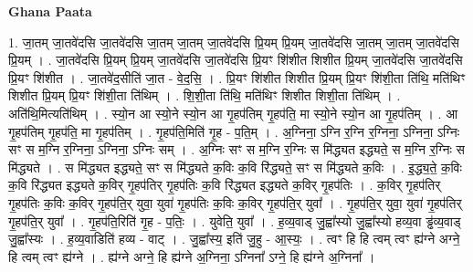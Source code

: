 \documentclass[17pt]{extarticle}
\begin{document}
\textbf{Ghana Paata } \newline

1. जा॒तम् जा॒तवे॑दसि जा॒तवे॑दसि जा॒तम् जा॒तम् जा॒तवे॑दसि प्रि॒यम् प्रि॒यम् जा॒तवे॑दसि जा॒तम् जा॒तम् जा॒तवे॑दसि प्रि॒यम् । . जा॒तवे॑दसि प्रि॒यम् प्रि॒यम् जा॒तवे॑दसि जा॒तवे॑दसि प्रि॒यꣳ शि॑शीत शिशीत प्रि॒यम् जा॒तवे॑दसि जा॒तवे॑दसि प्रि॒यꣳ शि॑शीत । . जा॒तवे॑द॒सीति॑ जा॒त - वे॒द॒सि॒ । . प्रि॒यꣳ शि॑शीत शिशीत प्रि॒यम् प्रि॒यꣳ शि॑शी॒ता ति॑थि॒ मति॑थिꣳ शिशीत प्रि॒यम् प्रि॒यꣳ शि॑शी॒ता ति॑थिम् । . शि॒शी॒ता ति॑थि॒ मति॑थिꣳ शिशीत शिशी॒ता ति॑थिम् । . अति॑थि॒मित्यति॑थिम् । . स्यो॒न आ स्यो॒ने स्यो॒न आ गृ॒हप॑तिम् गृ॒हप॑ति॒ मा स्यो॒ने स्यो॒न आ गृ॒हप॑तिम् । . आ गृ॒हप॑तिम् गृ॒हप॑ति॒ मा गृ॒हप॑तिम् । . गृ॒हप॑ति॒मिति॑ गृ॒ह - प॒ति॒म् । . अ॒ग्निना॒ ऽग्नि र॒ग्नि र॒ग्निना॒ ऽग्निना॒ ऽग्निः सꣳ स म॒ग्नि र॒ग्निना॒ ऽग्निना॒ ऽग्निः सम् । . अ॒ग्निः सꣳ स म॒ग्नि र॒ग्निः स मि॑द्ध्यत इद्ध्यते॒ स म॒ग्नि र॒ग्निः स मि॑द्ध्यते । . स मि॑द्ध्यत इद्ध्यते॒ सꣳ स मि॑द्ध्यते क॒विः क॒वि रि॑द्ध्यते॒ सꣳ स मि॑द्ध्यते क॒विः । . इ॒द्ध्य॒ते॒ क॒विः क॒वि रि॑द्ध्यत इद्ध्यते क॒विर् गृ॒हप॑तिर् गृ॒हप॑तिः क॒वि रि॑द्ध्यत इद्ध्यते क॒विर् गृ॒हप॑तिः । . क॒विर् गृ॒हप॑तिर् गृ॒हप॑तिः क॒विः क॒विर् गृ॒हप॑ति॒र् युवा॒ युवा॑ गृ॒हप॑तिः क॒विः क॒विर् गृ॒हप॑ति॒र् युवा᳚ । . गृ॒हप॑ति॒र् युवा॒ युवा॑ गृ॒हप॑तिर् गृ॒हप॑ति॒र् युवा᳚ । . गृ॒हप॑ति॒रिति॑ गृ॒ह - प॒तिः॒ । . युवेति॒ युवा᳚ । . ह॒व्य॒वाड् जु॒ह्वा᳚स्यो जु॒ह्वा᳚स्यो हव्य॒वा ड्ढ॑व्य॒वाड् जु॒ह्वा᳚स्यः । . ह॒व्य॒वाडिति॑ हव्य - वाट् । . जु॒ह्वा᳚स्य॒ इति॑ जु॒हु - आ॒स्यः॒ । . त्वꣳ हि हि त्वम् त्वꣳ ह्य॑ग्ने अग्ने॒ हि त्वम् त्वꣳ ह्य॑ग्ने । . ह्य॑ग्ने अग्ने॒ हि ह्य॑ग्ने अ॒ग्निना॒ ऽग्निना᳚ ऽग्ने॒ हि ह्य॑ग्ने अ॒ग्निना᳚ । \newline
\end{document}
